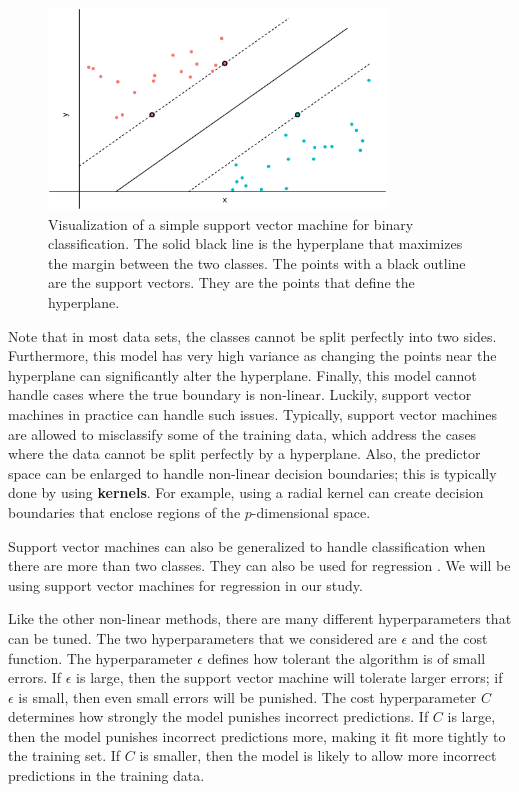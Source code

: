 \documentclass{article}
\begin{document}
	\begin{figure}[h!]
		\centering
		\includegraphics[width = 0.8\textwidth]{images/svm.eps}
		\captionsetup{width = 0.8\textwidth}
		\caption{Visualization of a simple support vector machine for binary classification. The solid black line is the hyperplane that maximizes the margin between the two classes. The points with a black outline are the support vectors. They are the points that define the hyperplane.}
		\label{fig:svm}
	\end{figure}
	
	Note that in most data sets, the classes cannot be split perfectly into two sides. Furthermore, this model has very high variance as changing the points near the hyperplane can significantly alter the hyperplane. Finally, this model cannot handle cases where the true boundary is non-linear. Luckily, support vector machines in practice can handle such issues. Typically, support vector machines are allowed to misclassify some of the training data, which address the cases where the data cannot be split perfectly by a hyperplane. Also, the predictor space can be enlarged to handle non-linear decision boundaries; this is typically done by using \textbf{kernels}. For example, using a radial kernel can create decision boundaries that enclose regions of the $p$-dimensional space.
	
	Support vector machines can also be generalized to handle classification when there are more than two classes. They can also be used for regression \cite{drucker1997support}. We will be using support vector machines for regression in our study.
	
	Like the other non-linear methods, there are many different hyperparameters that can be tuned. The two hyperparameters that we considered are $\epsilon$ and the cost function. The hyperparameter $\epsilon$ defines how tolerant the algorithm is of small errors. If $\epsilon$ is large, then the support vector machine will tolerate larger errors; if $\epsilon$ is small, then even small errors will be punished. The cost hyperparameter $C$ determines how strongly the model punishes incorrect predictions. If $C$ is large, then the model punishes incorrect predictions more, making it fit more tightly to the training set. If $C$ is smaller, then the model is likely to allow more incorrect predictions in the training data.
	
\end{document}
